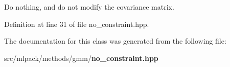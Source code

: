 Do nothing, and do not modify the covariance matrix. 



Definition at line 31 of file no\-\_\-constraint.\-hpp.



The documentation for this class was generated from the following file\-:\begin{DoxyCompactItemize}
\item 
src/mlpack/methods/gmm/{\bf no\-\_\-constraint.\-hpp}\end{DoxyCompactItemize}
